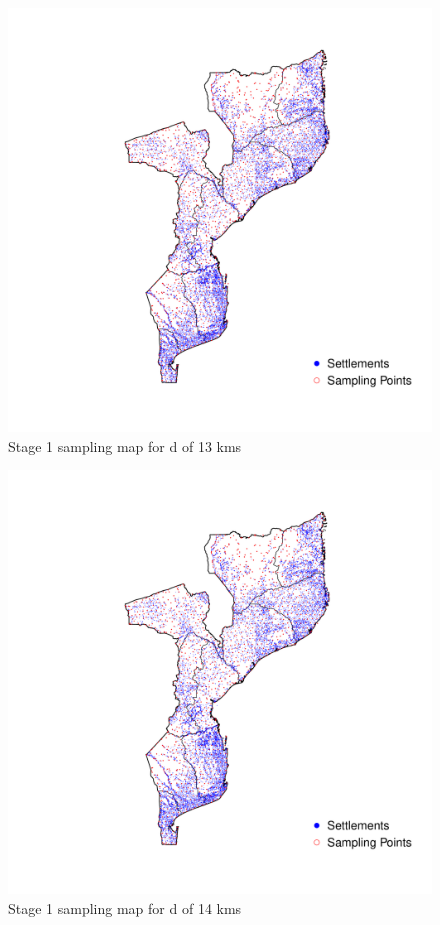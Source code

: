\documentclass[
  12pt,
  a4paper]{article}
\begin{document}
\begin{figure}[H]

{\centering \includegraphics{mozambiqueNotes_files/figure-latex/stage1plot13-1} 

}

\caption{Stage 1 sampling map for d of 13 kms}\label{fig:stage1plot13}
\end{figure}

\begin{figure}[H]

{\centering \includegraphics{mozambiqueNotes_files/figure-latex/stage1plot14-1} 

}

\caption{Stage 1 sampling map for d of 14 kms}\label{fig:stage1plot14}
\end{figure}
\end{document}
